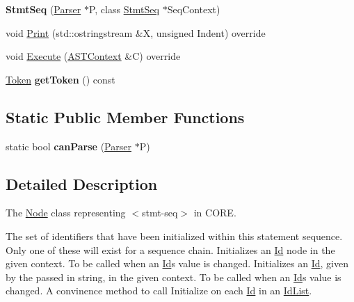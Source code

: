 \begin{DoxyCompactItemize}
\mbox{\label{class_stmt_seq_a4425f9cc5dc2596127437723ae96f762}} 
{\bfseries Stmt\+Seq} (\mbox{\hyperlink{class_parser}{Parser}} $\ast$P, class \mbox{\hyperlink{class_stmt_seq}{Stmt\+Seq}} $\ast$Seq\+Context)
\item 
void \mbox{\hyperlink{class_stmt_seq_aa9044b5fc51430f8da4d62b8c0beb8e7}{Print}} (std\+::ostringstream \&X, unsigned Indent) override
\item 
void \mbox{\hyperlink{class_stmt_seq_a7ed19a3d07348f0dab9f35861aa49382}{Execute}} (\mbox{\hyperlink{class_a_s_t_context}{A\+S\+T\+Context}} \&C) override
\item 
\mbox{\label{class_stmt_seq_a2e81edae0368f072bed08394775d03ed}} 
\mbox{\hyperlink{class_token}{Token}} {\bfseries get\+Token} () const
\end{DoxyCompactItemize}
\subsection*{Static Public Member Functions}
\begin{DoxyCompactItemize}
\item 
\mbox{\label{class_stmt_seq_a67b798afec171357ab13576b67ca58dc}} 
static bool {\bfseries can\+Parse} (\mbox{\hyperlink{class_parser}{Parser}} $\ast$P)
\end{DoxyCompactItemize}


\subsection{Detailed Description}
The \mbox{\hyperlink{class_node}{Node}} class representing {\ttfamily $<$stmt-\/seq$>$} in C\+O\+RE. 

The set of identifiers that have been initialized within this statement sequence. Only one of these will exist for a sequence chain. Initializes an \mbox{\hyperlink{class_id}{Id}} node in the given context. To be called when an \mbox{\hyperlink{class_id}{Id}}\textquotesingle{}s value is changed. Initializes an \mbox{\hyperlink{class_id}{Id}}, given by the passed in string, in the given context. To be called when an \mbox{\hyperlink{class_id}{Id}}\textquotesingle{}s value is changed. A convinence method to call {\ttfamily Initialize} on each {\ttfamily \mbox{\hyperlink{class_id}{Id}}} in an {\ttfamily \mbox{\hyperlink{class_id_list}{Id\+List}}}.

